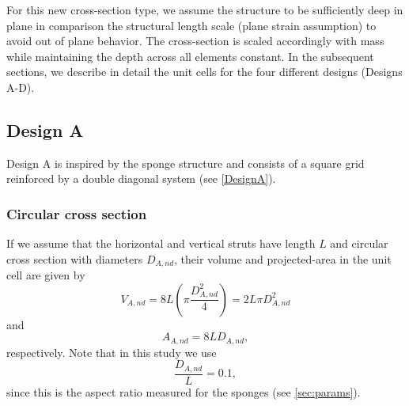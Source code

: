 \documentclass[10pt,twoside]{fernandes_supp}
\begin{document}
For this new cross-section type, we assume the structure to be sufficiently deep in plane in comparison the structural length scale (plane strain assumption) to avoid out of plane behavior. The cross-section is scaled accordingly with mass while maintaining the depth across all elements constant. In the subsequent sections, we describe in detail the unit cells for the four different designs (Designs A-D).

\subsection{Design A}
Design A is inspired by the sponge structure and consists of a square grid  reinforced by a double diagonal system (see \cref{DesignA}). 
\subsubsection{Circular cross section} 
If we assume that the horizontal and vertical struts have length $L$ and circular cross section  with diameters $D_{A,nd}$, their volume and projected-area in the unit cell are given by 
\begin{equation}\label{V1}
V_{A,nd}=8 L \left(\pi\frac{D^2_{A,nd}}{4}\right)=2 L \pi D^2_{A,nd}
\end{equation}
and
\begin{equation}\label{A1}
A_{A,nd}=8 L D_{A,nd},
\end{equation}
respectively. Note that in this study we use 
\begin{equation}
\frac{D_{A,nd}}{L}=0.1,
\end{equation}
since this is the aspect ratio measured for the sponges (see \cref{sec:params}).
\end{document}
